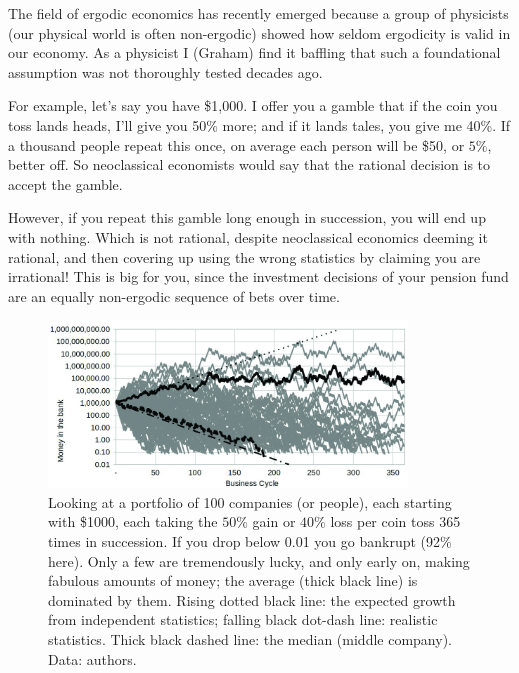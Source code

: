 The field of ergodic economics has recently emerged because a group of physicists (our physical world is often non-ergodic) showed how seldom ergodicity is valid in our economy\cite{peters-gell-mann, buchanan-ergodicity, peters-ergodicity-economics}. As a physicist I (Graham) find it baffling that such a foundational assumption was not thoroughly tested decades ago. 


For example\cite{peters-ergodicity-economics}, let's say you have \$1,000. I offer you a gamble that if the coin you toss lands heads, I'll give you 50\% more; and if it lands tales, you give me 40\%. If a thousand people repeat this once, on average each person will be \$50, or $5\%$, better off. So neoclassical economists  would say that the rational decision is to accept the gamble.


However, if you repeat this gamble long enough in succession, you will end up with nothing. Which is not rational, despite neoclassical economics deeming it rational, and then covering up using the wrong statistics by claiming you are irrational! This is big for you, since the investment decisions of your pension fund are an equally non-ergodic sequence of bets over time.


\begin{figure}
\centering
\includegraphics[width=0.85\textwidth]{./Images/portfolio-PrintReady}
\caption[Losing money long term even on a good bet.]{Looking at a portfolio of 100 companies (or people), each starting with \$1000, each taking the $50\%$ gain or $40\%$ loss per coin toss 365 times in succession. If you drop below 0.01 you go bankrupt (92\% here). Only a few are tremendously lucky, and only early on, making fabulous amounts of money; the average (thick black line) is dominated by them. Rising dotted black line: the expected growth from independent statistics; falling black dot-dash line: realistic statistics. Thick black dashed line: the median (middle company). Data: authors.}
\label{fig:bet-path-1c-cutoff}
\end{figure}


